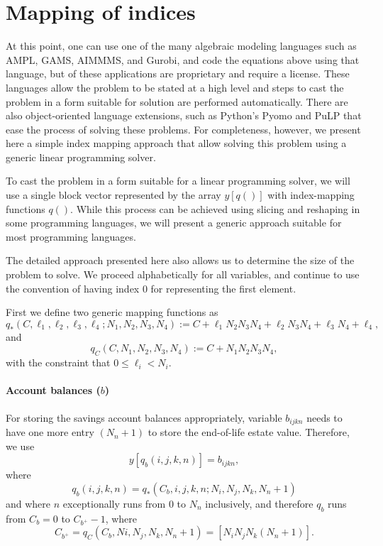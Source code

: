 \documentclass{article}[fleqn,12pt]
\begin{document}
\section{Mapping of indices}
At this point, one can use one of the many algebraic modeling languages
such as AMPL, GAMS, AIMMMS, and Gurobi, and code the equations above
using that language, but of these applications are
proprietary and require a license.
These languages allow the problem to be stated at a high level and
steps to cast the problem in a form suitable for solution are performed automatically.
There are also object-oriented language extensions, such as Python's Pyomo
and PuLP that ease the process of solving these problems.
For completeness, however, we present here a simple
index mapping approach that allow solving this problem using a generic
linear programming solver.

To cast the problem in a form suitable for a linear programming solver, we will use
a single block vector represented by the array $y[q()]$ with index-mapping functions $q()$.
While this process can be achieved using slicing and reshaping in some programming
languages, we will present a generic approach suitable for most programming languages.

The detailed approach presented here also allows us to determine the size of the problem to solve.
We proceed alphabetically for all variables, and continue to use the convention of having
index 0 for representing the first element.

First we define two generic mapping functions as
\begin{equation}
	q_*(C, \ell_1, \ell_2, \ell_3, \ell_4; N_1, N_2, N_3, N_4) :=
	C + \ell_1N_2N_3N_4 + \ell_2N_3N_4 + \ell_3N_4 + \ell_4,
\end{equation}
and
\begin{equation}
	q_C(C, N_1, N_2, N_3, N_4) :=
	C + N_1N_2N_3N_4,
\end{equation}
with the constraint that $0 \le \ell_i < N_i$.

\paragraph*{Account balances (\boldmath$b$)}
For storing the savings account balances appropriately, variable $b_{ijkn}$ needs to have one
more entry $(N_n + 1)$ to
store the end-of-life estate value. Therefore, we use
\begin{equation}
	y[q_b(i, j, k, n)] = b_{ijkn},
\end{equation}
where
\begin{equation}
	\label{Eq:Extra}
	q_b(i, j, k, n) = q_*(C_b, i, j, k, n; N_i, N_j, N_k, N_n+1)
\end{equation}
and where $n$ exceptionally runs from 0 to $N_n$ inclusively, and therefore
$q_b$ runs from $C_b = 0$ to $C_{b^+} - 1$,
where
\[
	C_{b^+} = q_C(C_b, Ni, N_j, N_k, N_n+1) = [N_i N_j N_k (N_n+1)].
\]
\end{document}
